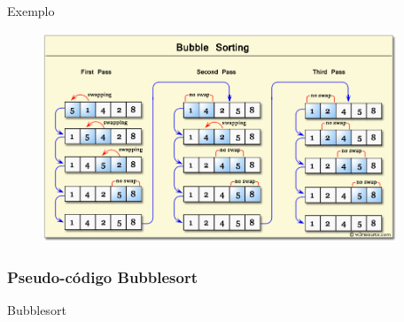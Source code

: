 \documentclass[aspectratio=169]{beamer}
\begin{document}

% 



\begin{frame}{Exemplo}
\begin{figure}[!h]
  \centering
  \includegraphics[width=300pt]{imgs/bubble-short.png}
  \label{fig_bubble-short}
\end{figure}
\end{frame}


\begin{frame}
\frametitle{Pseudo-código Bubblesort}
\begin{algorithm}[H]
\caption{Bubblesort} 
\label{Bubblesort}
\end{algorithm}
\end{frame}
\end{document}

